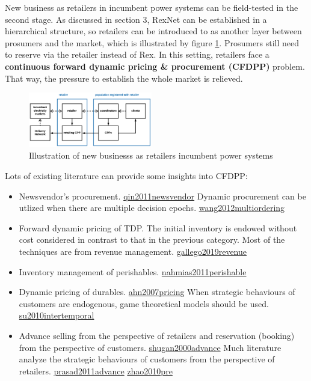\documentclass[letterpaper,8pt,twocolumn,twoside,]{pinp}
\providecommand{\tightlist}{%
  \setlength{\itemsep}{0pt}\setlength{\parskip}{0pt}}
\begin{document}
New business as retailers in incumbent power systems can be field-tested
in the second stage. As discussed in section 3, RexNet can be
established in a hierarchical structure, so retailers can be introduced
to as another layer between prosumers and the market, which is
illustrated by figure \ref{3}. Prosumers still need to reserve via the
retailer instead of Rex. In this setting, retailers face a
\textbf{continuous forward dynamic pricing \& procurement (CFDPP)}
problem. That way, the pressure to establish the whole market is
relieved.

\begin{figure}
  \begin{center}
    \includegraphics[width=0.48\textwidth]{../../../images/4-11.png} 
  \end{center}
  \caption{Illustration of new businesss as retailers incumbent power systems}
  \label{3}
\end{figure}

Lots of existing literature can provide some insights into CFDPP:

\begin{itemize}
\tightlist
\item
  Newsvendor's procurement.
  \protect\hyperlink{reference}{qin2011newsvendor} Dynamic procurement
  can be utlized when there are multiple decision epochs.
  \protect\hyperlink{reference}{wang2012multiordering}
\item
  Forward dynamic pricing of TDP. The initial inventory is endowed
  without cost considered in contrast to that in the previous category.
  Most of the techniques are from revenue management.
  \protect\hyperlink{reference}{gallego2019revenue}
\item
  Inventory management of perishables.
  \protect\hyperlink{reference}{nahmias2011perishable}
\item
  Dynamic pricing of durables.
  \protect\hyperlink{reference}{ahn2007pricing} When strategic
  behaviours of customers are endogenous, game theoretical models should
  be used. \protect\hyperlink{reference}{su2010intertemporal}
\item
  Advance selling from the perspective of retailers and reservation
  (booking) from the perspective of customers.
  \protect\hyperlink{reference}{shugan2000advance} Much literature
  analyze the strategic behaviours of customers from the perspective of
  retailers. \protect\hyperlink{reference}{prasad2011advance}
  \protect\hyperlink{reference}{zhao2010pre}
\end{itemize}
\end{document}
